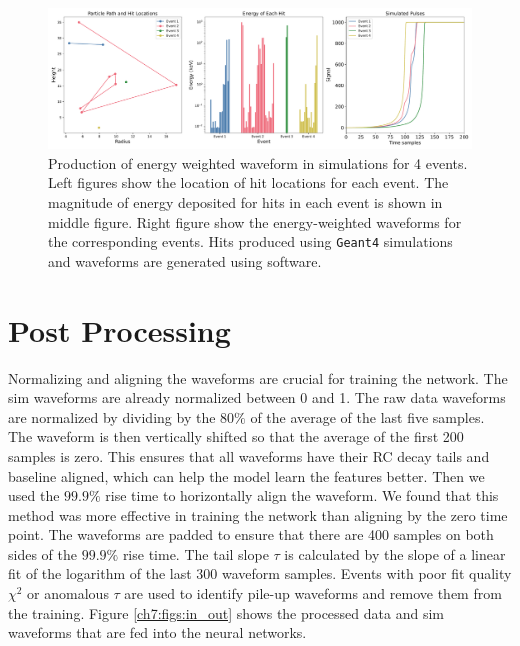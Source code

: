 \begin{figure}[htb!]
    \includegraphics[width=0.99\linewidth,trim={1pc 0pc 1pc 0pc},clip]{ch7/figs/hit_sims.pdf}
    \caption{Production of energy weighted waveform in simulations for 4 events. Left figures show the location of hit locations for each event.  The magnitude of energy deposited for hits in each event is shown in middle figure. Right figure show the energy-weighted waveforms for the corresponding events. Hits produced using \texttt{Geant4} simulations and waveforms are generated using {\siggen} software.}
   \label{ch7_fig_eng_dep_sim}
\end{figure}


\section{Post Processing}

Normalizing and aligning the waveforms are crucial for training the network. The sim waveforms are already normalized between 0 and 1. The raw data waveforms are normalized by dividing by the $80\%$ of the average of the last five samples. The waveform is then vertically shifted so that the average of the first 200 samples is zero. This ensures that all waveforms have their RC decay tails and baseline aligned, which can help the model learn the features better. Then we used the $99.9\%$ rise time to horizontally align the waveform. We found that this method was more effective in training the network than aligning by the zero time point. The waveforms are padded to ensure that there are 400 samples on both sides of the $99.9\%$ rise time. The tail slope $\tau$ is calculated by the slope of a linear fit of the logarithm of the last 300 waveform samples. Events with poor fit quality $\chi^2$ or anomalous $\tau$ are used to identify pile-up waveforms and remove them from the training. Figure \ref{ch7:figs:in_out} shows the processed data and sim waveforms that are fed into the neural networks.

